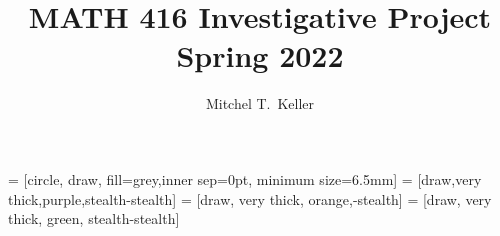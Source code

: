 \documentclass{amsart}
\begin{document}
\title{MATH 416 Investigative Project\\Spring 2022}

\author{Mitchel T.\ Keller}
\maketitle

 = [circle, draw, fill=grey,inner sep=0pt, minimum size=6.5mm]
 = [draw,very thick,purple,stealth-stealth]
 = [draw, very thick, orange,-stealth]
 = [draw, very thick, green, stealth-stealth]
\end{document}
